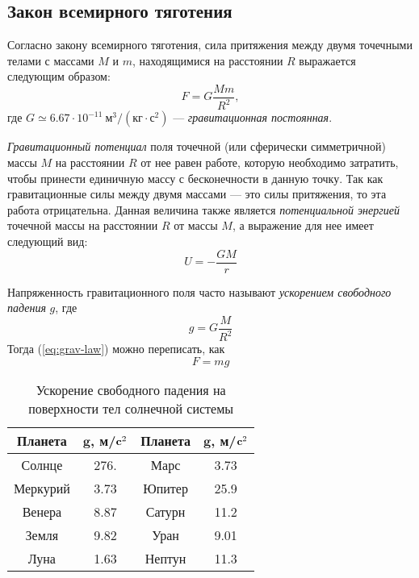 \subsection{Закон всемирного тяготения}
Согласно закону всемирного тяготения, сила притяжения 
между двумя точечными телами с массами $M$ и $m$,
находящимися на расстоянии $R$ выражается следующим
образом:\begin{equation}
	F=G\frac{Mm}{R^2}, \label{eq:grav-law}
\end{equation}
где $G\simeq 6.67\cdot 10^{-11}~\text{м}^3 / 
\left( \text{кг} \cdot \text{с}^2 \right)$ --- 
{\itshape гравитационная постоянная}.

{\itshape Гравитационный потенциал} поля точечной (или сферически 
симметричной) массы $M$ на расстоянии $R$ от нее равен
работе, которую необходимо затратить, чтобы принести
единичную массу с бесконечности в данную точку. Так как
гравитационные силы между двумя массами --- это силы 
притяжения, то эта работа отрицательна. Данная
величина также является {\itshape потенциальной энергией} точечной
массы на расстоянии $R$ от массы $M$, а выражение для нее имеет 
следующий вид:\begin{equation}
U=-\frac{GM}{r}
\end{equation}

Напряженность гравитационного поля часто называют 
{\itshape ускорением свободного падения} $g$, где\begin{equation}
	g = G \frac{M}{R^2}
\end{equation}
Тогда (\ref{eq:grav-law}) можно переписать, как \begin{equation}
	F = mg
\end{equation}
\begin{table}[h!]
\centering
\begin{tabular}{|c|c|c|c|}
\hline 
{\bfseries Планета} & $\mathbf{g}$, 
{\bfseries м/$\text{\bfseries c}^2$} 
& {\bfseries Планета} & $\mathbf{g}$, 
{\bfseries м/$\text{\bfseries c}^2$}\\
\hline
Солнце & 276. & Марс & 3.73\\
\hline
Меркурий & 3.73 & Юпитер & 25.9\\
\hline
Венера & 8.87 & Сатурн & 11.2\\
\hline
Земля & 9.82 & Уран & 9.01\\
\hline
Луна & 1.63 & Нептун & 11.3\\
\hline
\end{tabular}
\caption{Ускорение свободного падения на поверхности тел 
солнечной системы}
\end{table}